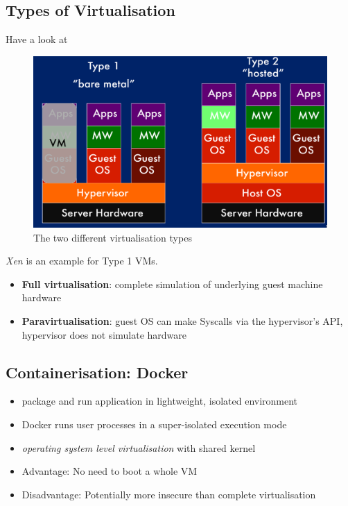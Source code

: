 \documentclass[a4paper]{article}
\begin{document}
\begin{multicols}{3}
\subsection{Types of Virtualisation}
 Have a look at 

\begin{figure}[H]
    \includegraphics[width=\linewidth]{vmtypes.png}
    \caption{The two different virtualisation types}
    \label{fig:vmtypes}
\end{figure}

\textit{Xen} is an example for Type 1 VMs.

\begin{itemize}
    \item \textbf{Full virtualisation}: complete simulation of underlying guest machine hardware
    \item \textbf{Paravirtualisation}: guest OS can make Syscalls via the hypervisor's API, hypervisor does not simulate hardware
\end{itemize}

\subsection{Containerisation: Docker}
\begin{itemize}
    \item package and run application in lightweight, isolated environment
    \item Docker runs user processes in a super-isolated execution mode
    \item \textit{operating system level virtualisation} with shared kernel
    \item Advantage: No need to boot a whole VM
    \item Disadvantage: Potentially more insecure than complete virtualisation
\end{itemize}


\end{multicols}
\end{document}
